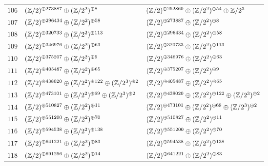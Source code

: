 \begin{supertabular}{|c|p{5.5cm}|p{5.5cm}|}
$106$%
&$(\mathbb{Z}/2)^{\oplus273887}\oplus(\mathbb{Z}/2^{2})^{\oplus8}$%
&$(\mathbb{Z}/2)^{\oplus252860}\oplus(\mathbb{Z}/2^{2})^{\oplus54}\oplus\mathbb{Z}/2^{3}$\\

$107$%
&$(\mathbb{Z}/2)^{\oplus296434}\oplus(\mathbb{Z}/2^{2})^{\oplus58}$%
&$(\mathbb{Z}/2)^{\oplus273887}\oplus(\mathbb{Z}/2^{2})^{\oplus8}$\\

$108$%
&$(\mathbb{Z}/2)^{\oplus320733}\oplus(\mathbb{Z}/2^{2})^{\oplus113}$%
&$(\mathbb{Z}/2)^{\oplus296434}\oplus(\mathbb{Z}/2^{2})^{\oplus58}$\\

$109$%
&$(\mathbb{Z}/2)^{\oplus346976}\oplus(\mathbb{Z}/2^{2})^{\oplus63}$%
&$(\mathbb{Z}/2)^{\oplus320733}\oplus(\mathbb{Z}/2^{2})^{\oplus113}$\\

$110$%
&$(\mathbb{Z}/2)^{\oplus375207}\oplus(\mathbb{Z}/2^{2})^{\oplus9}$%
&$(\mathbb{Z}/2)^{\oplus346976}\oplus(\mathbb{Z}/2^{2})^{\oplus63}$\\

$111$%
&$(\mathbb{Z}/2)^{\oplus405487}\oplus(\mathbb{Z}/2^{2})^{\oplus65}$%
&$(\mathbb{Z}/2)^{\oplus375207}\oplus(\mathbb{Z}/2^{2})^{\oplus9}$\\

$112$%
&$(\mathbb{Z}/2)^{\oplus438020}\oplus(\mathbb{Z}/2^{2})^{\oplus122}\oplus(\mathbb{Z}/2^{3})^{\oplus2}$%
&$(\mathbb{Z}/2)^{\oplus405487}\oplus(\mathbb{Z}/2^{2})^{\oplus65}$\\

$113$%
&$(\mathbb{Z}/2)^{\oplus473101}\oplus(\mathbb{Z}/2^{2})^{\oplus69}\oplus(\mathbb{Z}/2^{3})^{\oplus2}$%
&$(\mathbb{Z}/2)^{\oplus438020}\oplus(\mathbb{Z}/2^{2})^{\oplus122}\oplus(\mathbb{Z}/2^{3})^{\oplus2}$\\

$114$%
&$(\mathbb{Z}/2)^{\oplus510827}\oplus(\mathbb{Z}/2^{2})^{\oplus11}$%
&$(\mathbb{Z}/2)^{\oplus473101}\oplus(\mathbb{Z}/2^{2})^{\oplus69}\oplus(\mathbb{Z}/2^{3})^{\oplus2}$\\

$115$%
&$(\mathbb{Z}/2)^{\oplus551200}\oplus(\mathbb{Z}/2^{2})^{\oplus70}$%
&$(\mathbb{Z}/2)^{\oplus510827}\oplus(\mathbb{Z}/2^{2})^{\oplus11}$\\

$116$%
&$(\mathbb{Z}/2)^{\oplus594538}\oplus(\mathbb{Z}/2^{2})^{\oplus138}$%
&$(\mathbb{Z}/2)^{\oplus551200}\oplus(\mathbb{Z}/2^{2})^{\oplus70}$\\

$117$%
&$(\mathbb{Z}/2)^{\oplus641221}\oplus(\mathbb{Z}/2^{2})^{\oplus83}$%
&$(\mathbb{Z}/2)^{\oplus594538}\oplus(\mathbb{Z}/2^{2})^{\oplus138}$\\

$118$%
&$(\mathbb{Z}/2)^{\oplus691296}\oplus(\mathbb{Z}/2^{2})^{\oplus14}$%
&$(\mathbb{Z}/2)^{\oplus641221}\oplus(\mathbb{Z}/2^{2})^{\oplus83}$\\


\end{supertabular}
